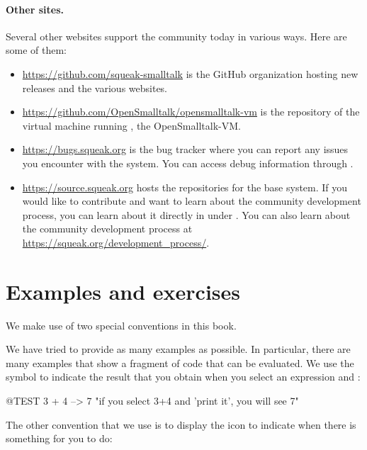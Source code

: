 \documentclass[a4paper,10pt,twoside]{book}
\begin{document}
\paragraph{Other sites.} Several other websites support the \sq community today in various ways.
Here are some of them:
\begin{itemize}
  \item \url{https://github.com/squeak-smalltalk} is the GitHub organization hosting new releases and the various \sq websites.

  \item \url{https://github.com/OpenSmalltalk/opensmalltalk-vm} is the repository of the virtual machine running \sq, the Open\-Smalltalk-VM.

  \item \url{https://bugs.squeak.org} is the bug tracker where you can report any issues you encounter with the system. You can access debug information through .

  \item \url{https://source.squeak.org} hosts the repositories for the base system. If you would like to contribute and want to learn about the community development process, you can learn about it directly in \Squeak under . You can also learn about the community development process at \url{https://squeak.org/development_process/}.

\end{itemize}

\section*{Examples and exercises}

We make use of two special conventions in this book.

We have tried to provide as many examples as possible.
In particular, there are many examples that show a fragment of code that can be evaluated.
We use the symbol \ct{-->} to indicate the result that you obtain when you select an expression and :

\begin{code}{@TEST}
3 + 4 --> 7    "if you select 3+4 and 'print it', you will see 7"
\end{code}


The other convention that we use is to display the icon \dothisicon{} to indicate when there is something for you to do:


\ifx\wholebook\relax\else
   
   
\end{document}
